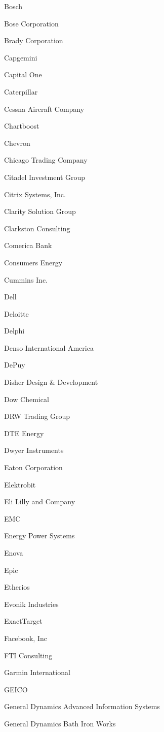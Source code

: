 \documentclass[twoside]{article}
\begin{document}
\begin{center}
\begin{multicols}{5}
\begin{FlushLeft}
\begin{compactitem}
\item Bosch
\item Bose Corporation
\item Brady Corporation
\item Capgemini
\item Capital One
\item Caterpillar
\item Cessna Aircraft Company
\item Chartboost
\item Chevron
\item Chicago Trading Company
\item Citadel Investment Group
\item Citrix Systems, Inc.
\item Clarity Solution Group
\item Clarkston Consulting
\item Comerica Bank
\item Consumers Energy
\item Cummins Inc.
\item Dell
\item Deloitte
\item Delphi
\item Denso International America
\item DePuy
\item Disher Design \& Development
\item Dow Chemical
\item DRW Trading Group
\item DTE Energy
\item Dwyer Instruments
\item Eaton Corporation
\item Elektrobit
\item Eli Lilly and Company
\item EMC
\item Energy Power Systems
\item Enova
\item Epic
\item Etherios
\item Evonik Industries
\item ExactTarget
\item Facebook, Inc
\item FTI Consulting
\item Garmin International
\item GEICO
\item General Dynamics Advanced Information Systems
\item General Dynamics Bath Iron Works

\end{compactitem}
\end{FlushLeft}
\end{multicols}
\end{center}
\end{document}

